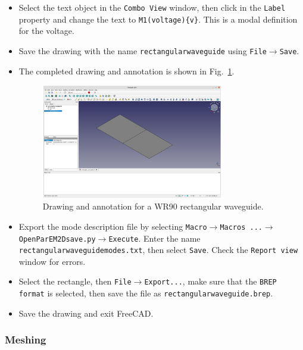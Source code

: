 \documentclass[titlepage]{article}
\renewcommand\_{\textunderscore\linebreak[1]}
\begin{document}
\begin{itemize}
\item Select the text object in the \texttt{Combo View} window, then click in the \texttt{Label} property and change the text to \texttt{\_M1(voltage)\{v\}}.  This is a modal definition for the voltage.
\item Save the drawing with the name \texttt{rectangular\_waveguide} using \texttt{File}$\rightarrow$\texttt{Save}.
\item The completed drawing and annotation is shown in Fig.~\ref{fig:rectangular_waveguide}.
\begin{figure}
  \centering
  \includegraphics[width=0.75\textwidth]{../tutorials/OpenParEM2D/rectangular_waveguide/screenshots/rectangular_waveguide}
  \caption{Drawing and annotation for a WR90 rectangular waveguide.}
  \label{fig:rectangular_waveguide}
\end{figure}
\item Export the mode description file by selecting \texttt{Macro}$\rightarrow$\texttt{Macros ...}$\rightarrow$\texttt{OpenParEM2D\_save.py}$\rightarrow$\texttt{Execute}.  Enter the name \texttt{rectangular\_waveguide\_modes.txt}, then select \texttt{Save}.  Check the \texttt{Report view} window for errors.
\item Select the rectangle, then \texttt{File}$\rightarrow$\texttt{Export...}, make sure that the \texttt{BREP format} is selected, then save the file as \texttt{rectangular\_waveguide.brep}.
\item Save the drawing and exit FreeCAD.
\end{itemize}

\subsubsection{Meshing}
\end{document}
